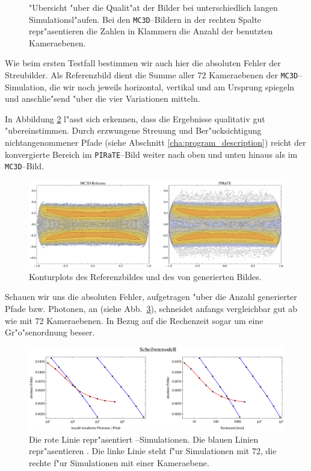 \begin{figure}
			\caption{"Ubersicht "uber die Qualit"at der Bilder bei unterschiedlich langen Simulationsl"aufen. Bei den \texttt{MC3D}--Bildern in der rechten Spalte repr"asentieren die Zahlen in Klammern die Anzahl der benutzten Kameraebenen.}
			\label{fig:disk_image_overview}
		\end{figure}
	
	Wie beim ersten Testfall bestimmen wir auch hier die absoluten Fehler der Streubilder. Als Referenzbild dient die Summe aller 72 Kameraebenen der \texttt{MC3D}--Simulation, die wir noch jeweils horizontal, vertikal und am Ursprung spiegeln und anschlie"send "uber die vier Variationen mitteln.

	In Abbildung \ref{fig:disk_contours}	l"asst sich erkennen, dass die Ergebnisse qualitativ gut "ubereinstimmen. Durch erzwungene Streuung und Ber"ucksichtigung nichtangenommener Pfade (siehe Abschnitt \ref{cha:program_description}) reicht der konvergierte Bereich im \texttt{PIRaTE}--Bild weiter nach oben und unten hinaus als im \texttt{MC3D}--Bild.
	
		\begin{figure}
			\centering
			\includegraphics[width=1.0\textwidth]{diskcontourplots.eps}
			\caption{Konturplots des Referenzbildes und des von \pirate generierten Bildes.}
			\label{fig:disk_contours}
		\end{figure}
	
	Schauen wir uns die absoluten Fehler, aufgetragen "uber die Anzahl generierter Pfade bzw. Photonen, an (siehe Abb.~\ref{fig:disk_error}), schneidet \pirate anfangs vergleichbar gut ab wie \mctd mit 72 Kameraebenen. In Bezug auf die Rechenzeit sogar um eine Gr"o"senordnung besser.
	
		\begin{figure}
			\centering
			\includegraphics[width=1.0\textwidth]{diskerrorplot.eps}
			\caption{Die rote Linie repr"asentiert \pirate--Simulationen. Die blauen Linien repr"asentieren \mctd. Die linke Linie steht f"ur Simulationen mit 72, die rechte f"ur Simulationen mit einer Kameraebene.}
			\label{fig:disk_error}
		\end{figure}
	

